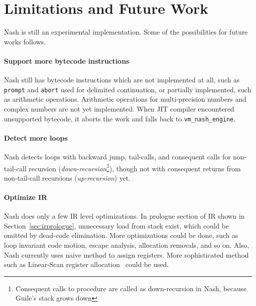 \documentclass[preprint, 10pt]{sigplanconf}
\begin{document}


\section{Limitations and Future Work}
\label{sec:future}

Nash is still an experimental implementation. Some of the possibilities for
future works follows.

\paragraph{Support more bytecode instructions} Nash still has bytecode
instructions which are not implemented at all, such as \texttt{prompt} and
\texttt{abort} used for delimited continuation, or partially implemented, such
as arithmetic operations. Arithmetic operations for multi-precision numbers
and complex numbers are not yet implemented. When JIT compiler encountered
unsupported bytecode, it aborts the work and falls back to
\texttt{vm\_nash\_engine}.

\paragraph{Detect more loops} Nash detects loops with backward jump,
tail-calls, and consequent calls for non-tail-call recursion
(\textit{down-recursion}\footnote{Consequent calls to procedure are called as
  down-recursion in Nash, because Guile's stack grows down}), though not with
consequent returns from non-tail-call recursions (\textit{up-recursion}) yet.


\paragraph{Optimize IR} Nash does only a few IR level
optimizations. In prologue section of IR shown in
Section~\hyperref[sec:irprologue]{\ref{sec:irprologue}}, unnecessary load from
stack exist, which could be omitted by dead-code elimination. More
optimizations could be done, such as loop invariant code motion, escape
analysis, allocation removals, and so on. Also, Nash currently uses naive
method to assign registers. More sophisticated method such as Linear-Scan
register allocation~\cite{poletto1999linear} could be used.
\end{document}
